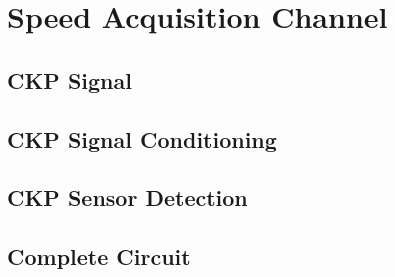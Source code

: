 \section{Speed Acquisition Channel}\label{sec:speed-acquisition-channel}
			

	\subsection{CKP Signal}\label{ssec:ckp-signal}

	\subsection{CKP Signal Conditioning}\label{ssec:ckp-signal-conditioning-circuit}

	\subsection{CKP Sensor Detection}\label{ssec:ckp-sensor-detection-circuit}

	\subsection{Complete Circuit}\label{ssec:spd-acq-complete-circuit}
